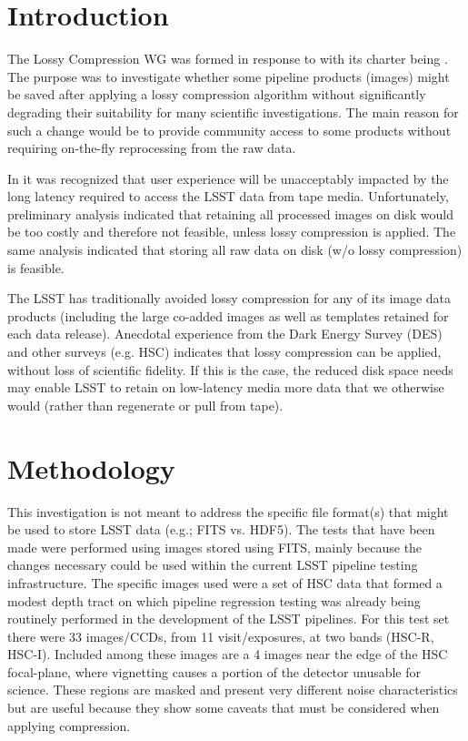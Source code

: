 
\section{Introduction}

The Lossy Compression WG was formed in response to  with its charter
being .  The purpose was to investigate whether some pipeline products
(images) might be saved after applying a lossy compression algorithm without significantly
degrading their suitability for many scientific investigations.  The main reason 
for such a change would be to provide community access to some products without 
requiring on-the-fly reprocessing from the raw data.

In  it was recognized that user 
experience will be unacceptably impacted by the long latency required to 
access the LSST data from tape media. Unfortunately, preliminary analysis
indicated that retaining all processed images on disk would be too costly 
and therefore not feasible, unless lossy compression is applied. The same
analysis indicated that storing all raw data on disk (w/o lossy compression)
is feasible.

The LSST has traditionally avoided lossy compression for any of its image 
data products (including the large co-added images as well as templates 
retained for each data release). Anecdotal experience from the Dark Energy 
Survey (DES) and other surveys (e.g. HSC) indicates that lossy compression 
can be applied, without loss of scientific fidelity.  If this is the case, 
the reduced disk space needs may enable LSST to retain on low-latency media 
more data that we otherwise would (rather than regenerate or pull from tape). 


\section{Methodology}

This investigation is not meant to address the specific file format(s) that might be
used to store LSST data (e.g.; FITS vs. HDF5).  The tests that have been made were performed
using images stored using FITS, mainly because the changes necessary could be used within 
the current LSST pipeline testing infrastructure.  The specific images used were a set of
HSC data that formed a modest depth tract on which pipeline regression testing was already
being routinely performed in the development of the LSST pipelines.  For this test set there
were 33 images/CCDs, from 11 visit/exposures, at two bands (HSC-R, HSC-I).  Included among
these images are a 4 images near the edge of the HSC focal-plane, where vignetting causes
a portion of the detector unusable for science.  These regions are masked and present very 
different noise characteristics but are useful because they show some caveats that must be
considered when applying compression.

